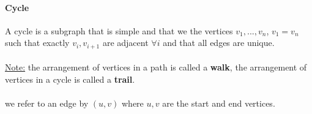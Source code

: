 \documentclass[12pt]{article}
\begin{document}
\paragraph{Cycle} A cycle is a subgraph that is simple and that we the vertices $v_1, ... ,v_{n}$, $v_1 = v_n$ such that exactly $v_i, v_{i+1}$ are adjacent $\forall i$ and that all edges are unique.\\
\\

\underline{Note:} the arrangement of vertices in a path is called a \textbf{walk}, the arrangement of vertices in a cycle is called a \textbf{trail}.\\
\\
we refer to an edge by $(u,v)$ where $u,v$ are the start and end vertices.

\newpage
\end{document}

